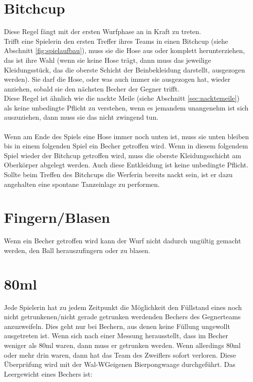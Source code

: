 \documentclass[a5paper, 12pt]{book}
\begin{document}
\section{Bitchcup}\label{sec:bitchcup}
Diese Regel fängt mit der ersten Wurfphase an in Kraft zu treten.\\Trifft eine Spielerin den ersten Treffer ihres Teams in einen Bitchcup (siehe Abschnitt \ref{fig:spielaufbau}), muss sie die Hose aus oder komplett herunterziehen, das ist ihre Wahl (wenn sie keine Hose trägt, dann muss das jeweilige Kleidungsstück, das die oberste Schicht der Beinbekleidung darstellt, ausgezogen werden). Sie darf die Hose, oder was auch immer sie ausgezogen hat, wieder anziehen, sobald sie den nächsten Becher der Gegner trifft. \\
Diese Regel ist ähnlich wie die nackte Meile (siehe Abschnitt \ref{sec:nacktemeile}) als keine unbedingte Pflicht zu verstehen, wenn es jemandem unangenehm ist sich auszuziehen, dann muss sie das nicht zwingend tun.\\\\
Wenn am Ende des Spiels eine Hose immer noch unten ist, muss sie unten bleiben bis in einem folgenden Spiel ein Becher getroffen wird. Wenn in diesem folgendem Spiel wieder der Bitchcup getroffen wird, muss die oberste Kleidungsschicht am Oberkörper abgelegt werden. Auch diese Entkleidung ist keine unbedingte Pflicht.\\
Sollte beim Treffen des Bitchcups die Werferin bereits nackt sein, ist er dazu angehalten eine spontane Tanzeinlage zu performen.
\section{Fingern/Blasen}\label{sec:fingern/blasen}
Wenn ein Becher getroffen wird kann der Wurf nicht dadurch ungültig gemacht werden, den Ball herauszufingern oder zu blasen.
\section{80ml}\label{sec:80ml}
Jede Spielerin hat zu jedem Zeitpunkt die Möglichkeit den Füllstand eines noch nicht getrunkenen/nicht gerade getrunken werdenden Bechers des Gegnerteams anzuzweifeln. Dies geht nur bei Bechern, aus denen keine Füllung ungewollt ausgetreten ist. Wenn sich nach einer Messung herausstellt, dass im Becher weniger als 80ml waren, dann muss er getrunken werden. Wenn allerdings 80ml oder mehr drin waren, dann hat das Team des Zweiflers sofort verloren. Diese Überprüfung wird mit der Wal-WG\texttrademark eigenen Bierpongwaage durchgeführt. Das Leergewicht eines Bechers ist:
\end{document}
